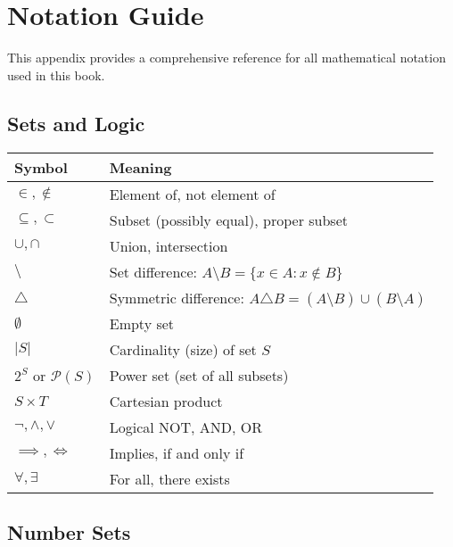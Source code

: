 \chapter{Notation Guide}
\label{app:notation}

This appendix provides a comprehensive reference for all mathematical notation used in this book.

\section{Sets and Logic}

\begin{center}
\begin{tabular}{|l|l|}
\hline
\textbf{Symbol} & \textbf{Meaning} \\
\hline
$\in, \notin$ & Element of, not element of \\
$\subseteq, \subset$ & Subset (possibly equal), proper subset \\
$\cup, \cap$ & Union, intersection \\
$\setminus$ & Set difference: $A \setminus B = \{x \in A : x \notin B\}$ \\
$\triangle$ & Symmetric difference: $A \triangle B = (A \setminus B) \cup (B \setminus A)$ \\
$\emptyset$ & Empty set \\
$|S|$ & Cardinality (size) of set $S$ \\
$2^S$ or $\mathcal{P}(S)$ & Power set (set of all subsets) \\
$S \times T$ & Cartesian product \\
$\neg, \land, \lor$ & Logical NOT, AND, OR \\
$\implies, \iff$ & Implies, if and only if \\
$\forall, \exists$ & For all, there exists \\
\hline
\end{tabular}
\end{center}

\section{Number Sets}

